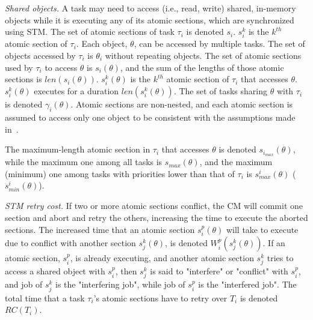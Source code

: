 \documentclass[conference]{IEEEtran}
\begin{document}
\textit{Shared objects.} A task may need to access (i.e., read, write) shared, in-memory objects while it is executing any of its atomic sections, which are synchronized using STM. 
The set of atomic sections of task $\tau_i$ is denoted $s_i$. $s_i^k$ is the $k^{th}$ atomic section of $\tau_i$. 
Each object, $\theta$, can be accessed by multiple tasks. The set of objects accessed by $\tau_i$ is $\theta_i$ without repeating objects.
The set of atomic sections used by $\tau_i$ to access $\theta$ is $s_i(\theta)$, and the sum of the lengths of those atomic sections is $len(s_i(\theta))$. $s_i^k(\theta)$ is the $k^{th}$ atomic section of $\tau_i$ that accesses $\theta$. $s_i^k(\theta)$  executes for a duration $len(s_i^k(\theta))$.
The set of tasks sharing $\theta$ with $\tau_i$ is denoted $\gamma_i(\theta)$. Atomic sections are non-nested, and each atomic section is assumed to access only one object to be consistent with the assumptions made in~\cite{stmconcurrencycontrol:emsoft11}.%

The maximum-length atomic section in $\tau_i$ that accesses $\theta$ is denoted $s_{i_{max}} (\theta)$, while the maximum one among all tasks is $s_{max} (\theta)$, and the maximum (minimum) one among tasks with priorities lower than that of $\tau_i$ is $s_{max}^i (\theta)$ ($s_{min}^i (\theta)$).

\textit{STM retry cost.} If two or more atomic sections conflict, the CM will commit one section and abort and retry the others, increasing the time to execute the aborted sections. The increased time that an atomic section $s_i^p (\theta)$ will take to execute due to conflict with another section $s_j^k (\theta)$, is denoted $W_{i}^{p}(s_{j}^{k}(\theta))$. If an atomic section, $s_i^p$, is already executing, and another atomic section $s_j^k$ tries to access a shared object with $s_i^p$, then $s_j^k$ is said to "interfere" or "conflict" with $s_i^p$, and job of $s_j^k$ is the "interfering job", while job of $s_i^p$ is the "interfered job". The total time that a task $\tau_i$'s atomic sections have to retry over $T_i$ is denoted $RC(T_i)$.
\end{document}
